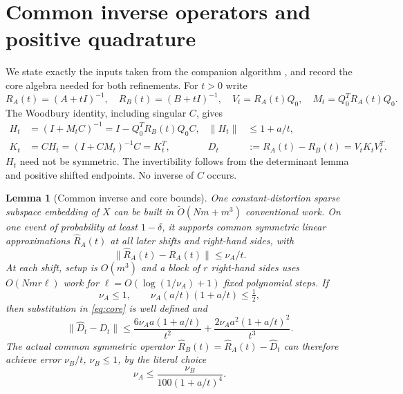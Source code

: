 \documentclass[11pt]{article}
\newtheorem{lemma}[theorem]{Lemma}
\numberwithin{equation}{section}
\begin{document}
\section{Common inverse operators and positive quadrature}

We state exactly the inputs taken from the companion algorithm
\cite{Raw}, and record the core algebra needed for both refinements.
For $t>0$ write
\[
 R_A(t)=(A+tI)^{-1},\quad R_B(t)=(B+tI)^{-1},\quad
 V_t=R_A(t)Q_0,\quad M_t=Q_0^TR_A(t)Q_0.
\]
The Woodbury identity, including singular $C$, gives
\begin{align}
 H_t&=(I+M_tC)^{-1}=I-Q_0^TR_B(t)Q_0C,
             &\|H_t\|&\le1+a/t,\label{eq:Hcore}\\
 K_t&=CH_t=(I+CM_t)^{-1}C=K_t^T,
             &D_t&:=R_A(t)-R_B(t)=V_tK_tV_t^T.
                                                        \label{eq:core}
\end{align}
$H_t$ need not be symmetric. The invertibility follows from the
determinant lemma and positive shifted endpoints. No inverse of $C$
occurs.

\begin{lemma}[Common inverse and core bounds]\label{lem:inverse}
One constant-distortion sparse subspace embedding of $X$ can be built
in $\widetilde O(Nm+m^3)$ conventional work. On one event of probability
at least $1-\delta$, it supports common symmetric linear approximations
$\widehat R_A(t)$ at all later shifts and right-hand sides, with
\begin{equation}\label{eq:inverse-error}
 \|\widehat R_A(t)-R_A(t)\|\le\nu_A/t.
\end{equation}
At each shift, setup is $O(m^3)$ and a block of $r$ right-hand sides
uses $O(Nmr\ell)$ work for $\ell=O(\log(1/\nu_A)+1)$ fixed polynomial
steps. If
\begin{equation}\label{eq:core-condition}
 \nu_A\le1,\qquad \nu_A(a/t)(1+a/t)\le\tfrac12,
\end{equation}
then substitution in \eqref{eq:core} is well defined and
\begin{equation}\label{eq:core-error}
 \|\widehat D_t-D_t\|\le
 \frac{6\nu_Aa(1+a/t)}{t^2}
       +\frac{2\nu_Aa^2(1+a/t)^2}{t^3}.
\end{equation}
The actual common symmetric operator
$\widehat R_B(t)=\widehat R_A(t)-\widehat D_t$ can therefore achieve
error $\nu_B/t$, $\nu_B\le1$, by the literal choice
\begin{equation}\label{eq:Bprecision}
 \nu_A\le\frac{\nu_B}{100(1+a/t)^4}.
\end{equation}
\end{lemma}
\end{document}
